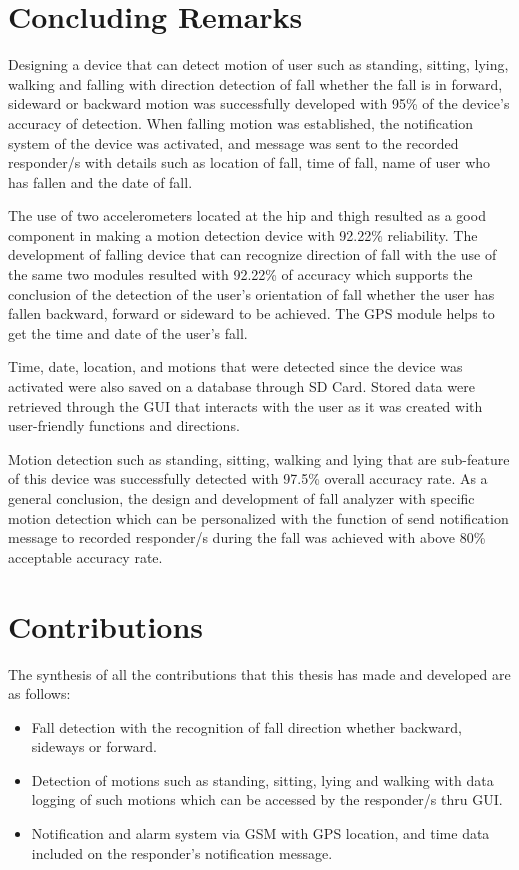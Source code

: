 \section{Concluding Remarks}

Designing a device that can detect motion of user such as standing, sitting, lying, walking and falling with direction detection of fall whether the fall is in forward, sideward or backward motion was successfully developed with 95\% of the device’s accuracy of detection. When falling motion was established, the notification system of the device was activated, and message was sent to the recorded responder/s with details such as location of fall, time of fall, name of user who has fallen and the date of fall.  

The use of two accelerometers located at the hip and thigh resulted as a good component in making a motion detection device with 92.22\% reliability. The development of falling device that can recognize direction of fall with the use of the same two modules resulted with 92.22\% of accuracy which supports the conclusion of the detection of the user’s orientation of fall whether the user has fallen backward, forward or sideward to be achieved. The GPS module helps to get the time and date of the user’s fall.


Time, date, location, and motions that were detected since the device was activated were also saved on a database through SD Card. Stored data were retrieved through the GUI that interacts with the user as it was created with user-friendly functions and directions. 

Motion detection such as standing, sitting, walking and lying that are sub-feature of this device was successfully detected with 97.5\% overall accuracy rate. As a general conclusion, the design and development of fall analyzer with specific motion detection which can be personalized with the function of send notification message to recorded responder/s during the fall was achieved with above 80\% acceptable accuracy rate.

\section{Contributions}

The synthesis of all the contributions that this thesis has made and developed are as follows:

\begin{itemize}
  \item Fall detection with the recognition of fall direction whether backward, sideways or forward.
	
	\item Detection of motions such as standing, sitting, lying and walking with data logging of such motions which can be accessed by the responder/s thru GUI.
  
  \item Notification and alarm system via GSM with GPS location, and time data included on the responder’s notification message.
	
\end{itemize}


